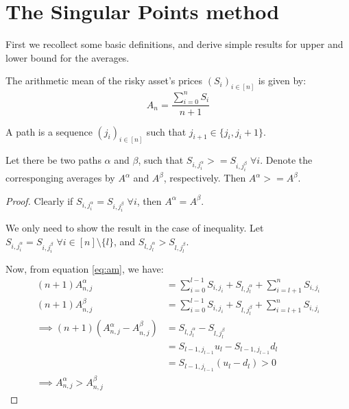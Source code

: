\section{The Singular Points method}
\label{sec:sing-points-meth}

First we recollect some basic definitions, and derive simple results for upper and lower bound for the averages.


\begin{dfn}
  The arithmetic mean of the risky asset's prices $ (S_i)_{i \in [n]} $ is given by:
  \begin{equation}
    \label{eq:am}
    A_{n} = \frac{\sum_{i=0}^n S_i}{n+1}
  \end{equation}
\end{dfn}


\begin{dfn}[Path]
  A path is a sequence $(j_i)_{i \in [n]}$ such that $j_{i+1} \in \{ j_i,j_i+1 \}$.
\end{dfn}


\begin{thm}
  \label{thm:up-dn-path}
  Let there be two paths $\alpha$ and $\beta$, such that $S_{i,j_i^\alpha} >= S_{i,j_i^\beta} \; \forall i$. Denote the corresponging averages by $A^\alpha$ and $A^\beta$, respectively. Then $ A^\alpha >= A^\beta $.
\end{thm}

\begin{proof}
  Clearly if $S_{i,j_i^\alpha} = S_{i,j_i^\beta} \; \forall i$, then $A^\alpha = A^\beta$.

  We only need to show the result in the case of inequality.
  Let $ S_{i,j_i^\alpha} = S_{i,j_i^\beta} \; \forall i \in [n] \setminus \{l\} $, and $ S_{l,j_l^\alpha} > S_{l,j_l^\beta}$.

  Now, from equation \ref{eq:am}, we have:
  \begin{align*}
    (n+1) A_{n,j}^\alpha &= \sum_{i=0}^{l-1} S_{i,j_i} + S_{l,j_l^\alpha} + \sum_{i=l+1}^{n} S_{i,j_i} \\
    (n+1) A_{n,j}^\beta &= \sum_{i=0}^{l-1} S_{i,j_i} + S_{l,j_l^\beta} + \sum_{i=l+1}^{n} S_{i,j_i} \\
    \implies (n+1) \left(A_{n,j}^\alpha - A_{n,j}^\beta\right) &= S_{l,j_l^\alpha} - S_{l,j_l^\beta} \\
                         &= S_{l-1,j_{l-1}} u_l - S_{l-1,j_{l-1}} d_l \\
                         &= S_{l-1,j_{l-1}} (u_l - d_l) > 0 \\
    \implies A_{n,j}^\alpha > A_{n,j}^\beta
  \end{align*}
\end{proof}


